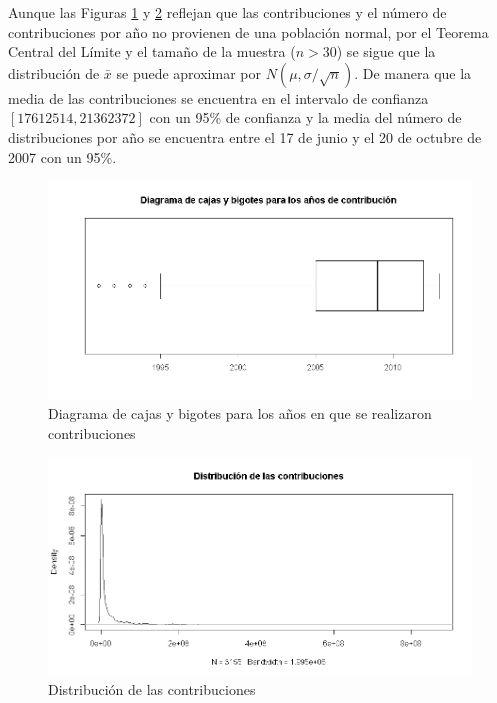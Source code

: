 \documentclass[11pt,letterpaper]{article}
\begin{document}
Aunque las Figuras \ref{fig:figure-01} y \ref{fig:figure-02} reflejan que las contribuciones y el número de contribuciones por año no provienen de una población normal, por el Teorema Central del Límite y el tamaño de la muestra ($n>30$)  se sigue que la distribución de $\bar{x}$ se puede aproximar por $N(\mu , \sigma / \sqrt{n})$.
De manera que la media de las contribuciones se encuentra en el intervalo de confianza $[17612514, 21362372]$ con un 95\% de confianza y la media del número de distribuciones por año se encuentra entre el 17 de junio y el 20 de octubre de 2007 con un 95\%.

\pagebreak 

\begin{figure}[t]
\centering
\includegraphics[scale=0.6]{density_year.png}
\caption{Diagrama de cajas y bigotes para los años en que se realizaron contribuciones}
\label{fig:figure-01}
\end{figure}

\begin{figure}[h!]
\centering
\includegraphics[scale=0.6]{density_amount2.png}
\caption{Distribución de las contribuciones}
\label{fig:figure-02} 
\end{figure}
\end{document}
